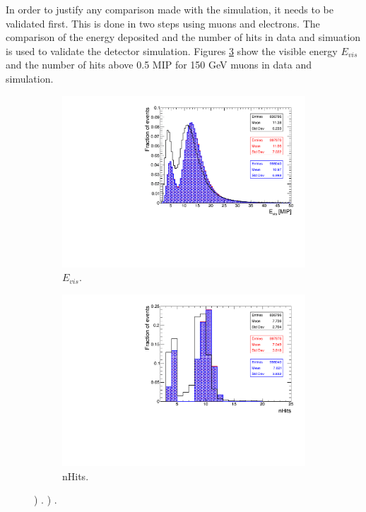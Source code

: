 In order to justify any comparison made with the simulation, it needs to be validated first. This is done in two steps using muons and electrons. The comparison of the energy deposited and the number of hits in data and simuation is used to validate the detector simulation. Figures \ref{fig:muVal} show the visible energy $E_{vis}$ and the number of hits above 0.5 MIP for 150 GeV muons in data and simulation.

\begin{figure}[htbp!]
  \centering
  \begin{subfigure}[t]{0.49\textwidth}
    \includegraphics[width=1.\linewidth]{chap5/fig_AHCAL_Timing/Muons/Validation_Evis_Muons.pdf}
    \caption{$E_{vis}$.} \label{fig:muEvis}
  \end{subfigure}
  \hfill
  \begin{subfigure}[t]{0.49\textwidth}
    \includegraphics[width=1.\linewidth]{chap5/fig_AHCAL_Timing/Muons/Validation_nHits_Muons.pdf}
    \caption{nHits.} \label{fig:munHits}
  \end{subfigure}
  \caption{) . ) .}
  \label{fig:muVal}
\end{figure}

